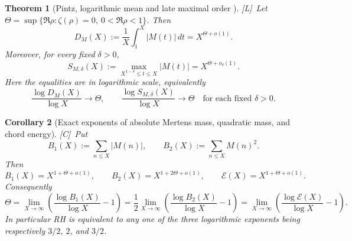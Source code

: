 \documentclass[11pt,reqno]{amsart}
\numberwithin{equation}{section}
\theoremstyle{plain}
\newtheorem{theorem}{Theorem}[section]
\newtheorem{corollary}[theorem]{Corollary}
\theoremstyle{definition}
\theoremstyle{remark}
\newcommand{\En}{\mathcal{E}}
\newcommand{\tagC}{\textup{[C]}}
\newcommand{\tagL}{\textup{[L]}}
\begin{document}
\begin{theorem}[Pintz, logarithmic mean and late maximal order
{\cite[Theorems~2.1 and~2.2]{Pintz2026}}]
\label{thm:pintz-2026}
\tagL\ Let $\Theta=\sup\{\Re\rho:\zeta(\rho)=0,\ 0<\Re\rho<1\}$.  Then
\begin{equation}
 D_M(X):=\frac1X\int_1^X|M(t)|\,dt=X^{\Theta+o(1)}.
\end{equation}
Moreover, for every fixed $\delta>0$,
\begin{equation}
 S_{M,\delta}(X):=\max_{X^{1-\delta}\le t\le X}|M(t)|
 =X^{\Theta+o_\delta(1)}.
\end{equation}
Here the equalities are in logarithmic scale, equivalently
\begin{equation}
 \frac{\log D_M(X)}{\log X}\to\Theta,
 \qquad
 \frac{\log S_{M,\delta}(X)}{\log X}\to\Theta
 \quad\text{for each fixed }\delta>0.
\end{equation}
\end{theorem}

\begin{corollary}[Exact exponents of absolute Mertens mass, quadratic mass, and chord energy]
\label{cor:pintz-excursion-exponents}
\tagC\ Put
\begin{equation}
 B_1(X):=\sum_{n\le X}|M(n)|,
 \qquad
 B_2(X):=\sum_{n\le X}M(n)^2.
\end{equation}
Then
\begin{equation}
\label{eq:pintz-B1-B2}
 B_1(X)=X^{1+\Theta+o(1)},
 \qquad
 B_2(X)=X^{1+2\Theta+o(1)},
 \qquad
 \En(X)=X^{1+\Theta+o(1)}.
\end{equation}
Consequently
\begin{equation}
\label{eq:Theta-from-excursions}
 \Theta=\lim_{X\to\infty}\left(\frac{\log B_1(X)}{\log X}-1\right)
 =\frac12\lim_{X\to\infty}
 \left(\frac{\log B_2(X)}{\log X}-1\right)
 =\lim_{X\to\infty}\left(\frac{\log\En(X)}{\log X}-1\right).
\end{equation}
In particular RH is equivalent to any one of the three logarithmic exponents
being respectively $3/2$, $2$, and $3/2$.
\end{corollary}
\end{document}
